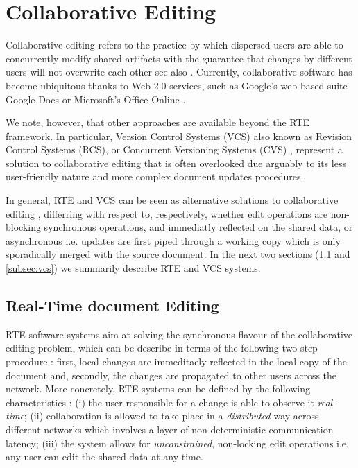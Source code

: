 \documentclass{sig-alternate}
\begin{document}
\section{Collaborative Editing}\label{sec:cde}
Collaborative editing refers to the practice by which dispersed
users are able to concurrently modify shared artifacts with the guarantee that changes
by different users will not overwrite each other \textemdash see also \cite{Altmanninger2009}.
Currently, collaborative software has become ubiquitous thanks to Web 2.0 services, such as
Google's web-based suite Google Docs \cite{Googlea} or
Microsoft's Office Online \cite{Microsoft}.

We note, however, that other approaches are available beyond the RTE framework. In
particular, Version Control Systems (VCS) \textemdash also known as Revision Control
Systems (RCS), or Concurrent Versioning Systems (CVS) \textemdash, represent a solution
to collaborative editing that is often overlooked due arguably to its less user-friendly
nature and more complex document updates procedures.

In general, RTE and VCS can be seen as alternative solutions to collaborative
editing \cite{Altmanninger2009}, differring with respect to, respectively, whether edit
operations are non-blocking synchronous operations, and immediatly reflected on the shared
data, or asynchronous \textemdash i.e. updates are first piped
through a working copy which is only sporadically merged with the source document.
In the next two sections (\ref{subsec:rte} and \ref{subsec:vcs}) we summarily describe RTE
and VCS systems.

\subsection{Real-Time document Editing}\label{subsec:rte}
RTE software systems aim at solving the synchronous flavour of the collaborative editing
problem, which can be describe in terms of the following two-step procedure \cite{Imine2009}:
first, local changes are immeditaely reflected in the local copy of the document and, secondly,
the changes are propagated to other users across the network.
More concretely, RTE systems can be defined by the following characteristics \cite{Sun1998}:
(i) the user responsible for a change is able to observe it \textit{real-time};
(ii) collaboration is allowed to take place in a \textit{distributed} way across
different networks \textemdash which involves a layer of non-deterministic communication
latency; (iii) the system allows for \textit{unconstrained}, non-locking edit operations
\textemdash i.e. any user can edit the shared data at any time.
\end{document}
